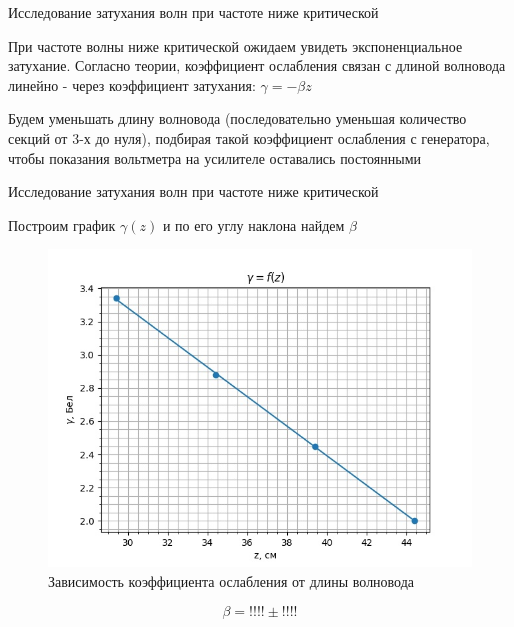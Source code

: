 \documentclass[12pt]{beamer}
\begin{document}
\begin{frame}{Исследование затухания волн при частоте ниже критической}

    \begin{block}{}
        При частоте волны ниже критической ожидаем увидеть экспоненциальное затухание. Согласно теории, коэффициент ослабления связан с длиной волновода линейно - через коэффициент затухания: $\gamma = -\beta z$
    \end{block}

    \begin{block}{}
        Будем уменьшать длину волновода (последовательно уменьшая количество секций от 3-х до нуля), подбирая такой коэффициент ослабления с генератора, чтобы показания вольтметра на усилителе оставались постоянными
    \end{block}
    
\end{frame}


\begin{frame}{Исследование затухания волн при частоте ниже критической}

    \begin{block}{}
        Построим график $\gamma(z)$ и по его углу наклона найдем $\beta$
    \end{block}

    \begin{figure}
        \centering
        \includegraphics[scale=0.35]{graf33.jpg}
        \caption{Зависимость коэффициента ослабления от длины волновода}
        \label{fig:enter-label}
    \end{figure}

    \begin{block}{}
        \begin{equation}
            \beta = !!!! \pm!!!!
        \end{equation}
    \end{block}
    
\end{frame}
\end{document}
